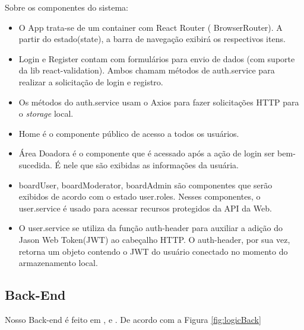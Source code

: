 Sobre os componentes do sistema:
\begin{itemize}
  \item O App trata-se de um container com React Router ( BrowserRouter). A partir do estado(state), a barra de navegação exibirá os respectivos itens.
  \item  Login e Register contam com formulários para envio de dados (com suporte da lib react-validation). Ambos chamam métodos de auth.service para realizar a solicitação de login e registro.
  \item Os métodos do auth.service usam o Axios para fazer solicitações HTTP para o \textit{storage} local.
   \item Home é o componente público de acesso a todos os usuários.
   \item Área Doadora é o componente que é acessado após a ação de login ser bem-sucedida. É nele que são exibidas as informações da usuária.
   \item boardUser, boardModerator, boardAdmin são componentes que serão exibidos de acordo com o estado user.roles. Nesses componentes, o user.service é usado para acessar recursos protegidos da API da Web.
   \item O user.service se utiliza da função auth-header para auxiliar a adição do Jason Web Token(JWT) ao cabeçalho HTTP. O auth-header, por sua vez, retorna um objeto contendo o JWT do usuário conectado no momento do armazenamento local.
\end{itemize}
\clearpage

\subsection{Back-End}
Nosso Back-end é feito em \cite{Node.js}, \cite{Express} e \cite{Sequelize}. De acordo com a Figura \ref{fig:logicBack}

